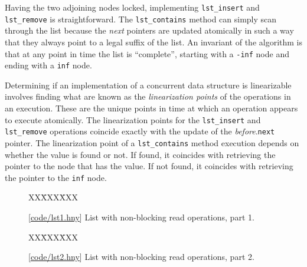 \documentclass{report}
\newcommand{\harmonysource}[1]{
\begin{tabbing}
XX\=XXX\=XXX\kill
    
\end{tabbing}
}
\newcommand{\harmonylink}[1]{%
[\href{https://www.cs.cornell.edu/home/rvr/harmony/#1}{\underline{#1}}]%
}
\newenvironment{code}{
\tcolorbox
}{
\endtcolorbox
}
\begin{document}
Having the two adjoining nodes locked, implementing \texttt{lst\_insert}
and \texttt{lst\_remove} is straightforward.
The \texttt{lst\_contains} method can simply scan through the list
because the \textit{next} pointers are updated atomically in such a
way that they always point to a legal suffix of the list.
An invariant of the algorithm is that at any point in time the
list is ``complete'', starting with a \texttt{-inf} node and ending
with a \texttt{inf} node.

Determining if an implementation of a concurrent data structure
is linearizable involves finding what are known as the
\emph{linearization points}
%
of the operations in an execution.  These are the unique
points in time at which an operation appears to execute atomically.
The linearization points for the \texttt{lst\_insert} and
\texttt{lst\_remove} operations coincide exactly with the update
of the \textit{before}.\texttt{next} pointer.
The linearization point of a \texttt{lst\_contains} method
execution depends on whether the value is found or not.
If found, it coincides with retrieving the pointer to the node
that has the value.
If not found, it coincides with retrieving the pointer to the
\texttt{inf} node.

\begin{figure}
\begin{code}
\harmonysource{lst1}
\end{code}
\caption{\harmonylink{code/lst1.hny} List with non-blocking read operations, part 1.}
\label{fig:lst1}
\end{figure}

\begin{figure}
\begin{code}
\harmonysource{lst2}
\end{code}
\caption{\harmonylink{code/lst2.hny} List with non-blocking read operations, part 2.}
\label{fig:lst2}
\end{figure}
\end{document}
